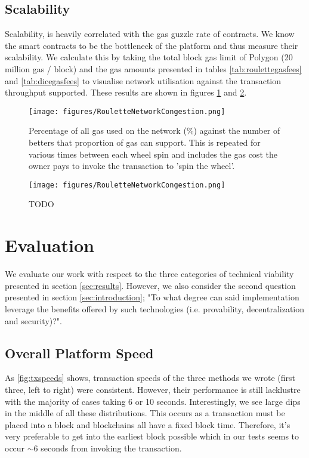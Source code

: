 \documentclass[10pt,journal,compsoc]{IEEEtran}
\begin{document}
\subsection{Scalability}
Scalability, is heavily correlated with the gas guzzle rate of contracts. We know the smart contracts to be the bottleneck of the platform and thus measure their scalability. We calculate this by taking the total block gas limit of Polygon (20 million gas / block) and the gas amounts presented in tables \ref{tab:roulettegasfees} and \ref{tab:dicegasfees} to visualise network utilisation against the transaction throughput supported. These results are shown in figures \ref{fig:roulettescalability} and \ref{fig:dicescalability}.

\begin{figure}[!h]
    \centering
    \texttt{[image: figures/RouletteNetworkCongestion.png]}
    \caption{Percentage of all gas used on the network (\%) against the number of betters that proportion of gas can support. This is repeated for various times between each wheel spin and includes the gas cost the owner pays to invoke the transaction to 'spin the wheel'.}
    \label{fig:roulettescalability}
\end{figure}

\begin{figure}[!h]
    \centering
    \texttt{[image: figures/RouletteNetworkCongestion.png]}
    \caption{TODO}
    \label{fig:dicescalability}
\end{figure}

\section{Evaluation}
We evaluate our work with respect to the three categories of technical viability presented in section \ref{sec:results}. However, we also consider the second question presented in section \ref{sec:introduction}; "To what degree can said implementation leverage the benefits offered by such technologies (i.e. provability, decentralization and security)?".

\subsection{Overall Platform Speed}
As \ref{fig:txspeeds} shows, transaction speeds of the three methods we wrote (first three, left to right) were consistent. However, their performance is still lacklustre with the majority of cases taking 6 or 10 seconds. Interestingly, we see large dips in the middle of all these distributions. This occurs as a transaction must be placed into a block and blockchains all have a fixed block time. Therefore, it's very preferable to get into the earliest block possible which in our tests seems to occur $\sim$6 seconds from invoking the transaction.
\end{document}
